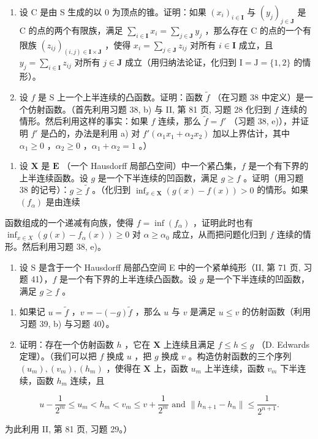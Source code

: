 \begin{enumerate}
\def\labelenumi{\alph{enumi})}
\item
  设 C 是由 S 生成的以 0 为顶点的锥。证明：如果 \((x_{i})_{i\in \mathbf{I}}\) 与 \((y_{j})_{j\in \mathbf{J}}\) 是 C 的点的两个有限族，满足 \(\sum_{i\in \mathbf{I}}x_i = \sum_{j\in \mathbf{J}}y_j\) ，那么存在 C 的点的一个有限族 \((z_{ij})_{(i,j)\in \mathbf{I}\times \mathbf{J}}\) ，使得 \(x_{i} = \sum_{j\in \mathbf{J}}z_{ij}\) 对所有 \(i\in \mathbf{I}\) 成立，且 \(y_{j} = \sum_{i\in \mathbf{I}}z_{ij}\) 对所有 \(j\in \mathbf{J}\) 成立（用归纳法论证，化归到 \(\mathrm{I} = \mathrm{J} = \{1,2\}\) 的情形）。
\item
  设 \(f\) 是 S 上一个上半连续的凸函数。证明：函数 \(\tilde{f}\) （在习题 38 中定义）是一个仿射函数。（首先利用习题 38, b) 与 II, 第 81 页, 习题 28 化归到 \(f\) 连续的情形。然后利用这样的事实：如果 \(f\) 连续，那么 \(\tilde{f} = f'\) （习题 38, e)），并证明 \(f'\) 是凸的，办法是利用 a) 对 \(f'(\alpha_1 x_1 + \alpha_2 x_2)\) 加以上界估计，其中 \(\alpha_1 \geqslant 0\) ，\(\alpha_2 \geqslant 0\) ，\(\alpha_1 + \alpha_2 = 1\) 。）
\end{enumerate}

\begin{enumerate}
\def\labelenumi{\arabic{enumi})}
\setcounter{enumi}{39}
\tightlist
\item
  设 \(\mathbf{X}\) 是 \(\mathbf{E}\) （一个 Hausdorff 局部凸空间）中一个紧凸集，\(f\) 是一个有下界的上半连续函数。设 \(g\) 是一个下半连续的凹函数，满足 \(g \geqslant f\) 。证明（用习题 38 的记号）：\(g \geqslant \tilde{f}\) 。（化归到 \(\inf_{x \in \mathbf{X}} (g(x) - f(x)) > 0\) 的情形。如果 \((f_{\alpha})\) 是由连续
\end{enumerate}

函数组成的一个递减有向族，使得 \(f = \inf(f_{\alpha})\) ，证明此时也有 \(\inf_{x \in X} (g(x) - f_{\alpha}(x)) \geqslant 0\) 对 \(\alpha \geqslant \alpha_0\) 成立，从而把问题化归到 \(f\) 连续的情形。然后利用习题 38, e)。

\begin{enumerate}
\def\labelenumi{\arabic{enumi})}
\setcounter{enumi}{40}
\tightlist
\item
  设 S 是含于一个 Hausdorff 局部凸空间 E 中的一个紧单纯形（II, 第 71 页, 习题 41），\(f\) 是一个有下界的上半连续凸函数。设 \(g\) 是一个下半连续的凹函数，满足 \(g \geqslant f\) 。
\end{enumerate}

\begin{enumerate}
\def\labelenumi{\alph{enumi})}
\item
  如果记 \(u = \tilde{f}\) ，\(v = -(-g)\tilde{f}\) ，那么 \(u\) 与 \(v\) 是满足 \(u \leqslant v\) 的仿射函数（利用习题 39, b) 与习题 40）。
\item
  证明：存在一个仿射函数 \(h\) ，它在 \(\mathbf{X}\) 上连续且满足 \(f \leqslant h \leqslant g\) （D. Edwards 定理）。（我们可以把 \(f\) 换成 \(u\) ，把 \(g\) 换成 \(v\) 。构造仿射函数的三个序列 \((u_m), (v_m), (h_m)\) ，使得在 \(\mathbf{X}\) 上，函数 \(u_m\) 上半连续，函数 \(v_m\) 下半连续，函数 \(h_m\) 连续，且
\end{enumerate}

\[
u - \frac {1}{2 ^ {m}} \leqslant u _ {m} <   h _ {m} <   v _ {m} \leqslant v + \frac {1}{2 ^ {m}} \text { and } \| h _ {n + 1} - h _ {n} \| \leqslant \frac {1}{2 ^ {n + 1}}.
\]

为此利用 II, 第 81 页, 习题 29。）

